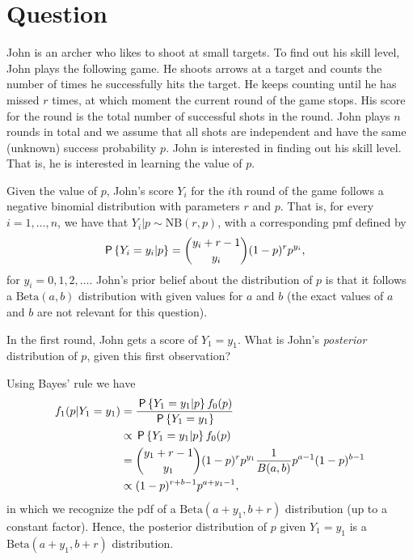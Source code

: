 \section{Question}

John is an archer who likes to shoot at small targets. To find out his skill level, John plays the following game. He shoots arrows at a target and counts the number of times he successfully hits the target. He keeps counting until he has missed $r$ times, at which moment the current round of the game stops. His score for the round is the total number of successful shots in the round. John plays $n$ rounds in total and we assume that all shots are independent and have the same (unknown) success probability $p$. John is interested in finding out his skill level. That is, he is interested in learning the value of $p$.

Given the value of $p$, John's score $Y_i$ for the $i$th round of the game follows a negative binomial distribution with parameters $r$ and $p$. That is, for every $i=1,\ldots,n$, we have that $Y_i|p \sim \text{NB}(r,p)$, with a corresponding pmf defined by
\begin{align}
    \P{Y_i = y_i | p} &= {y_i + r - 1 \choose y_i} (1 - p)^r p^{y_i},
\end{align}
for $y_i = 0,1,2,\ldots$. John's prior belief about the distribution of $p$ is that it follows a $\text{Beta}(a,b)$ distribution with given values for $a$ and $b$ (the exact values of $a$ and $b$ are not relevant for this question).

\begin{exercise}[2.5]
In the first round, John gets a score of $Y_1 = y_1$. What is John's \textit{posterior} distribution of $p$, given this first observation?
\begin{solution}
Using Bayes' rule we have
\begin{align}
    f_1(p|Y_1 = y_1) &= \frac{\P{Y_1 = y_1 | p} f_0(p)}{\P{Y_1 = y_1}} \\
    &\propto \P{Y_1 = y_1 | p} f_0(p) \\
    &= {y_1 + r - 1 \choose y_1} (1 - p)^r p^{y_1} \frac{1}{B(a,b)} p^{a-1} (1-p)^{b-1} \\
    &\propto (1 - p)^{r+b-1} p^{a+y_1-1},
\end{align}
in which we recognize the pdf of a $\text{Beta}(a+y_1, b + r)$ distribution (up to a constant factor). Hence, the posterior distribution of $p$ given $Y_1 = y_1$ is a $\text{Beta}(a+y_1, b + r)$ distribution.
\end{solution}
\end{exercise}

